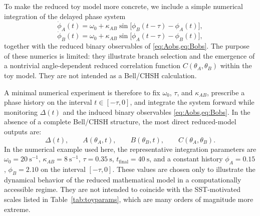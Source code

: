 \documentclass[11pt]{article}
\begin{document}
        To make the reduced toy model more concrete, we include a simple numerical integration of the delayed phase system
        \begin{equation}
            \dot{\phi}_A(t)=\omega_0+\kappa_{AB}\sin\!\big[\phi_B(t-\tau)-\phi_A(t)\big],
        \end{equation}
        \begin{equation}
            \dot{\phi}_B(t)=\omega_0+\kappa_{AB}\sin\!\big[\phi_A(t-\tau)-\phi_B(t)\big],
        \end{equation}
        together with the reduced binary observables of \cref{eq:Aobs,eq:Bobs}. The purpose of these numerics is limited: they illustrate branch selection and the emergence of a nontrivial angle-dependent reduced correlation function \(C(\theta_A,\theta_B)\) within the toy model. They are not intended as a Bell/CHSH calculation.

        A minimal numerical experiment is therefore to fix \(\omega_0\), \(\tau\), and \(\kappa_{AB}\), prescribe a phase history on the interval \(t\in[-\tau,0]\), and integrate the system forward while monitoring \(\Delta(t)\) and the induced binary observables \cref{eq:Aobs,eq:Bobs}. In the absence of a complete Bell/CHSH structure, the most direct reduced-model outputs are:
        \[
            \Delta(t),
            \qquad
            A(\theta_A,t),\qquad
            B(\theta_B,t),\qquad
            C(\theta_A,\theta_B).
        \]
        In the numerical example used here, the representative integration parameters are \(\omega_0=20~\mathrm{s^{-1}}\), \(\kappa_{AB}=8~\mathrm{s^{-1}}\), \(\tau=0.35~\mathrm{s}\), \(t_{\mathrm{final}}=40~\mathrm{s}\), and a constant history \(\phi_A=0.15\), \(\phi_B=2.10\) on the interval \([-\tau,0]\).
        These values are chosen only to illustrate the dynamical behavior of the reduced mathematical model in a computationally accessible regime. They are not intended to coincide with the SST-motivated scales listed in Table~\ref{tab:toyparams}, which are many orders of magnitude more extreme.
\end{document}
